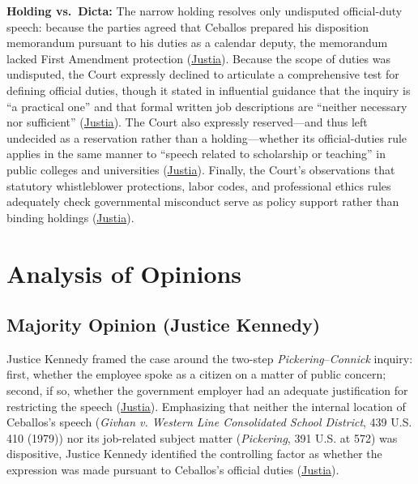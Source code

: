 \documentclass[12pt]{article}
\begin{document}
\textbf{Holding vs.\ Dicta:} The narrow holding resolves only undisputed official-duty speech: because the parties agreed that Ceballos prepared his disposition memorandum pursuant to his duties as a calendar deputy, the memorandum lacked First Amendment protection (\href{https://supreme.justia.com/cases/federal/us/547/410/}{Justia}). Because the scope of duties was undisputed, the Court expressly declined to articulate a comprehensive test for defining official duties, though it stated in influential guidance that the inquiry is ``a practical one'' and that formal written job descriptions are ``neither necessary nor sufficient'' (\href{https://supreme.justia.com/cases/federal/us/547/410/}{Justia}). The Court also expressly reserved---and thus left undecided as a reservation rather than a holding---whether its official-duties rule applies in the same manner to ``speech related to scholarship or teaching'' in public colleges and universities (\href{https://supreme.justia.com/cases/federal/us/547/410/}{Justia}). Finally, the Court's observations that statutory whistleblower protections, labor codes, and professional ethics rules adequately check governmental misconduct serve as policy support rather than binding holdings (\href{https://supreme.justia.com/cases/federal/us/547/410/}{Justia}).

\section{Analysis of Opinions}

\subsection{Majority Opinion (Justice Kennedy)}

Justice Kennedy framed the case around the two-step \textit{Pickering}--\textit{Connick} inquiry: first, whether the employee spoke as a citizen on a matter of public concern; second, if so, whether the government employer had an adequate justification for restricting the speech (\href{https://supreme.justia.com/cases/federal/us/547/410/}{Justia}). Emphasizing that neither the internal location of Ceballos's speech (\textit{Givhan v. Western Line Consolidated School District}, 439 U.S. 410 (1979)) nor its job-related subject matter (\textit{Pickering}, 391 U.S. at 572) was dispositive, Justice Kennedy identified the controlling factor as whether the expression was made pursuant to Ceballos's official duties (\href{https://supreme.justia.com/cases/federal/us/547/410/}{Justia}).
\end{document}
